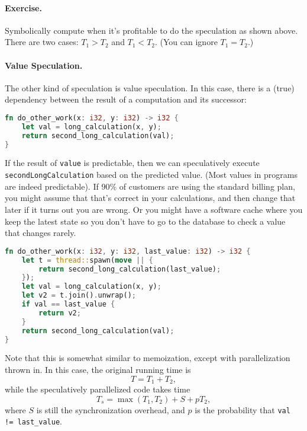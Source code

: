 \paragraph{Exercise.} Symbolically compute when it's profitable to do the
speculation as shown above. There are two cases: $T_1 > T_2$ and $T_1
< T_2$. (You can ignore $T_1 = T_2$.)


\paragraph{Value Speculation.}
The other kind of speculation is value speculation. In this case,
there is a (true) dependency between the result of a computation 
and its successor:

\begin{lstlisting}[language=Rust]
fn do_other_work(x: i32, y: i32) -> i32 {
    let val = long_calculation(x, y);
    return second_long_calculation(val);
}
\end{lstlisting}

If the result of {\tt value} is predictable, then we can speculatively
execute {\tt secondLongCalculation} based on the predicted value.
(Most values in programs are indeed predictable). If 90\% of customers are using the standard billing plan, you might assume that that's correct in your calculations, and then change that later if it turns out you are wrong. Or you might have a software cache where you keep the latest state so you don't have to go to the database to check a value that changes rarely. 

\begin{lstlisting}[language=Rust]
fn do_other_work(x: i32, y: i32, last_value: i32) -> i32 {
    let t = thread::spawn(move || {
        return second_long_calculation(last_value);
    });
    let val = long_calculation(x, y);
    let v2 = t.join().unwrap();
    if val == last_value {
        return v2;
    }
    return second_long_calculation(val);
}
\end{lstlisting}

Note that this is somewhat similar to memoization, except with 
parallelization thrown in. In this case, the original running time is
\[ T = T_1 + T_2, \]
while the speculatively parallelized code takes time
\[ T_s = \max(T_1, T_2) + S + pT_2,\]
where $S$ is still the synchronization overhead, and $p$ is the probability that
\verb+val != last_value+.

